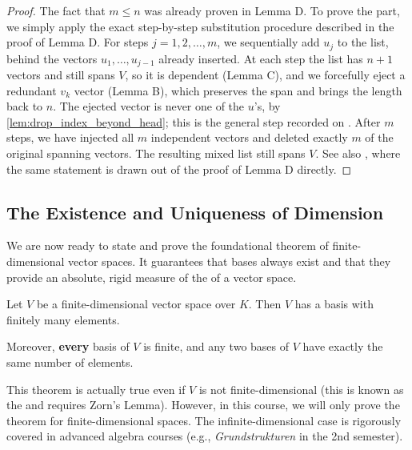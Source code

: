 \begin{proof}
The fact that $m \le n$ was already proven in Lemma D. To prove the  part, we simply apply the exact step-by-step substitution procedure described in the proof of Lemma D. 
For steps $j = 1, 2, \dots, m$, we sequentially add $u_j$ to the list, behind the vectors $u_1, \dots, u_{j-1}$ already inserted. At each step the list has $n+1$ vectors and still spans $V$, so it is dependent (Lemma C), and we forcefully eject a redundant $v_k$ vector (Lemma B), which preserves the span and brings the length back to $n$. The ejected vector is never one of the $u$'s, by \cref{lem:drop_index_beyond_head}; this is the general step recorded on . After $m$ steps, we have injected all $m$ independent vectors and deleted exactly $m$ of the original spanning vectors. The resulting mixed list still spans $V$. See also , where the same statement is drawn out of the proof of Lemma D directly.
\end{proof}

\subsection{The Existence and Uniqueness of Dimension}

We are now ready to state and prove the foundational theorem of finite-dimensional vector spaces. It guarantees that bases always exist and that they provide an absolute, rigid measure of the  of a vector space.

\begin{theorem}
\label{thm:basis_theorem}
Let $V$ be a finite-dimensional vector space over $K$. Then $V$ has a basis with finitely many elements. 

Moreover, \textbf{every} basis of $V$ is finite, and any two bases of $V$ have exactly the same number of elements.
\end{theorem}

\begin{remark}
This theorem is actually true even if $V$ is not finite-dimensional (this is known as the  and requires Zorn's Lemma). However, in this course, we will only prove the theorem for finite-dimensional spaces. The infinite-dimensional case is rigorously covered in advanced algebra courses (e.g., \textit{Grundstrukturen} in the 2nd semester).
\end{remark}

